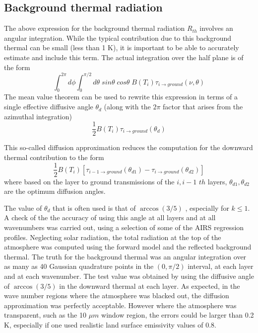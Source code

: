 \documentclass[11pt]{article}
\begin{document}
\subsection{Background thermal radiation}
The above expression for the background thermal radiation $R_{th}$ involves 
an angular integration. While the typical contribution due to this background
thermal can be small (less than 1 K), it is important to be able to 
accurately estimate and include this term. The actual integration over the 
half plane is of the form  
\begin{equation}
    \int_{0}^{2\pi}d\phi \int_{0}^{\pi/2} 
    d\theta \; sin\theta \; cos\theta \; B(T_{i}) 
    \tau_{i \rightarrow ground}(\nu,\theta)
\end{equation}
The mean value theorem can be used to rewrite this expression in terms of a 
single effective diffusive angle $\theta_{d}$ (along with the $2\pi$ factor 
that arises from the azimuthal integration) 
\begin{equation}
   \frac{1}{2} B(T_{i}) \tau_{i \rightarrow ground}(\theta_{d})
\end{equation}

This so-called diffusion approximation \cite{lio:80} reduces the computation 
for the downward thermal contribution to the form
\begin{equation}
    \frac{1}{2}B(T_{i}) \left[ \tau_{i-1 \rightarrow ground}
(\theta_{d1})- \tau_{i \rightarrow ground}(\theta_{d2}) \right] 
\end{equation}
where based on the layer to ground transmissions of the $i,i-1$ $th$
layers,  $\theta_{d1},\theta_{d2}$ are the optimum diffusion angles. 

The value of $\theta_{d}$ that is often used is that of $\arccos(3/5)$ 
\cite{lio:80}, especially for $k \le 1$.  A check of the the accuracy of 
using this angle at all layers and at all wavenumbers was carried out, using 
a selection of some of the AIRS regression profiles. Neglecting
solar radiation, the total radiation at the top of the atmosphere was
computed using the forward model and the reflected background thermal.
The truth for the background thermal was an angular integration over as many
as 40 Gaussian quadrature points in the $(0,\pi/2)$ interval, at each layer 
and at each wavenumber. The test value was obtained by using the diffusive 
angle of $\arccos (3/5)$ in the downward thermal at each layer. As expected,
in the wave number regions where the atmosphere was blacked out, the
diffusion approximation was perfectly acceptable. However where the atmosphere
was transparent, such as the 10 $\mu m$ window region, the errors could be 
larger than 0.2 K, especially if one used realistic land surface emissivity 
values of 0.8.
\end{document}
